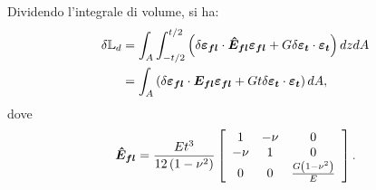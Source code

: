 Dividendo l'integrale di volume, si ha:
\begin{align}
\label{eq:7plv6}
\delta \mathbb{L}_d &= \int_A\int_{-t/2}^{t/2}\left(\delta\boldsymbol{\varepsilon_{fl}}\cdot\boldsymbol{\hat{E}_{fl}}\boldsymbol{\varepsilon_{fl}} +G\delta\boldsymbol{\varepsilon_{t}}\cdot\boldsymbol{\varepsilon_{t}}\right)dzdA\\
\label{eq:7plv6bis} &= \int_A\left(\delta\boldsymbol{\varepsilon_{fl}}\cdot\boldsymbol{E_{fl}}\boldsymbol{\varepsilon_{fl}} +Gt\delta\boldsymbol{\varepsilon_{t}}\cdot\boldsymbol{\varepsilon_{t}}\right)dA,
\end{align}
dove 
\begin{equation}
\label{eq:7plv7}
\boldsymbol{\hat{E}_{fl}} = \frac{Et^3}{12\left(1-\nu^2\right)}\left[\begin{array}{ccc}
1 & -\nu & 0\\-\nu & 1 & 0\\0&0& \frac{G\left(1-\nu^2\right)}{E}\end{array}\right].
\end{equation}

